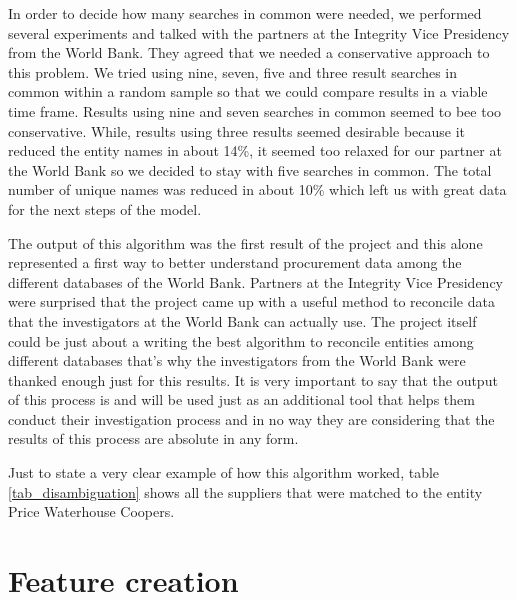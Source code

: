 In order to decide how many searches in common were needed, we performed several experiments and talked with the partners at the Integrity Vice Presidency from the World Bank. They agreed that we needed a conservative approach to this problem. We tried using  nine, seven, five and three result searches in common within a random sample so that we could compare results in a viable time frame. Results using nine and seven searches in common seemed to bee too conservative. While, results using three results seemed desirable because it reduced the entity names in about 14\%, it seemed too relaxed for our partner at the World Bank so we decided to stay with five searches in common.  The total number of unique names was reduced in about 10\% which left us with great data for the next steps of the model.

The output of this algorithm was the first result of the project and this alone represented a first way to better understand procurement data among the different databases of the World Bank. Partners at the Integrity Vice Presidency were surprised that the project came up with a useful method to reconcile data that the investigators at the World Bank can actually use. The project itself could be just about a writing the best algorithm to reconcile entities among different databases that's why the investigators from the World Bank were thanked enough just for this results. It is very important to say that the output of this process is and will be used just as an additional tool that helps them  conduct their investigation process and in no way they are considering that the results of this process are absolute in any form.

Just to state a very clear example of how this algorithm worked, table	\ref{tab_disambiguation} shows all the suppliers that were matched to the entity Price Waterhouse Coopers.



\section{Feature creation}















